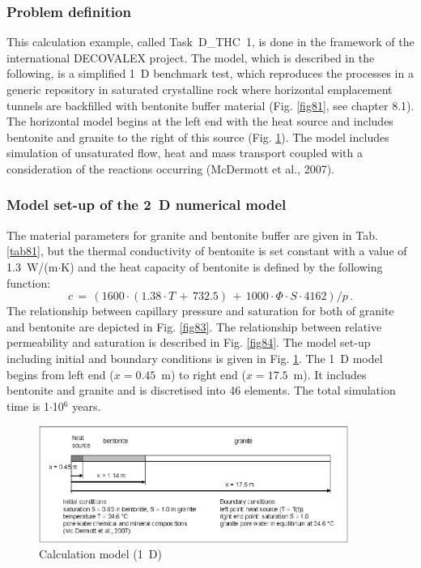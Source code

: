 
\subsubsection{Problem definition}

This calculation example, called Task~D\_THC~1, is done in the framework of the international DECOVALEX project. The model, which is described in the following, is a simplified 1~D benchmark test, which reproduces the processes in a generic repository in saturated crystalline rock where horizontal emplacement tunnels are backfilled with bentonite buffer material (Fig. \ref{fig81}, see chapter 8.1). The horizontal model begins at the left end with the heat source and includes bentonite and granite to the right of this source (Fig. \ref{fig91}). The model includes simulation of unsaturated flow, heat and mass transport coupled with a consideration of the reactions occurring (McDermott et al., 2007).

\subsubsection{Model set-up of the 2~D numerical model}

The material parameters for granite and bentonite buffer are given in Tab. \ref{tab81}, but the thermal conductivity of bentonite is set constant with a value of 1.3~W/(m$\cdot$K) and the heat capacity of bentonite is defined by the following function:
\begin{displaymath}
c\,=\,\left(1600\cdot\left(1.38\cdot T\,+\,732.5\right)
\,+\,1000\cdot\Phi\cdot S\cdot 4162\right)/p\,.
\end{displaymath}
The relationship between capillary pressure and saturation for both of granite and bentonite are depicted in Fig. \ref{fig83}. The relationship between relative permeability and saturation is described in Fig. \ref{fig84}. The model set-up including initial and boundary conditions is given in Fig. \ref{fig91}. The 1~D model begins from left end ($x=0.45$~m) to right end ($x=17.5$~m). It includes bentonite and granite and is discretised into 46 elements. The total simulation time is 1$\cdot$10$^6$ years.

\begin{figure}[htbp]
\centering
\includegraphics[width=0.9\textwidth]{THC/figures/fig91.eps}
\caption{Calculation model (1~D)}
\label{fig91}
\end{figure}

